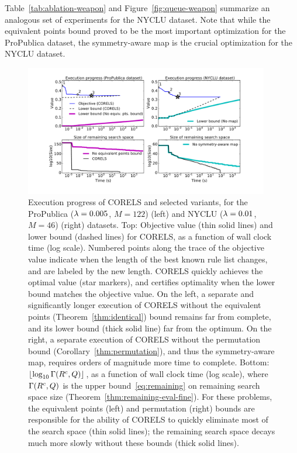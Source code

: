 Table~\ref{tab:ablation-weapon} and Figure~\ref{fig:queue-weapon} summarize an
analogous set of experiments for the NYCLU dataset.
%
Note that while the equivalent points bound proved to be the most important optimization for the ProPublica dataset,
the symmetry-aware map is the crucial optimization for the NYCLU dataset.

\begin{figure}[t!]
\begin{center}
\includegraphics[trim={30mm, 20mm, 30mm, 20mm},
width=0.95\textwidth]{figs/weapon_execution_large-remaining-space.pdf}
\end{center}
\caption{Execution progress of CORELS and selected variants,
for the ProPublica (${{\lambda} = 0.005}$, ${M = 122}$) (left)
and NYCLU (${{\lambda} = 0.01}$, ${M = 46}$) (right) datasets.
%
Top: Objective value (thin solid lines) and lower bound (dashed lines) for CORELS,
as a function of wall clock time (log scale).
%
Numbered points along the trace of the objective value
indicate when the length of the best known rule list changes,
and are labeled by the new length.
%
CORELS quickly achieves the optimal value (star markers),
and certifies optimality when the lower bound matches the objective value.
%
On the left, a separate and significantly longer execution of CORELS
without the equivalent points  (Theorem~\ref{thm:identical}) bound remains
far from complete, and its lower bound (thick solid line) far from the optimum.
%
On the right, a separate execution of CORELS without the permutation bound
(Corollary~\ref{thm:permutation}), and thus the symmetry-aware map,
requires orders of magnitude more time to complete.
%
Bottom: $\lfloor \log_{10} \Gamma({R^c}, Q) \rfloor$,
as a function of wall clock time (log scale),
where~$\Gamma({R^c}, Q)$
is the upper bound~\eqref{eq:remaining} on remaining search space size
(Theorem~\ref{thm:remaining-eval-fine}).
%
For these problems, the equivalent points (left) and
permutation (right) bounds are responsible for the ability of
CORELS to quickly eliminate most of the search space (thin solid lines);
the remaining search space decays much more slowly without these bounds (thick solid lines).
}
\label{fig:objective}
\end{figure}

